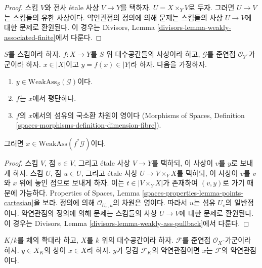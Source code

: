 \begin{proof}
스킴 $V$와 전사 \'etale 사상 $V \to Y$를 택하자.
$U = X \times_Y V$로 두자. 그러면 $U \to V$는 스킴들의 유한 사상이다.
약연관점의 정의에 의해 문제는 스킴들의 사상 $U \to V$에 대한 문제로
환원된다. 이 경우는 Divisors, Lemma
\ref{divisors-lemma-weakly-associated-finite}에서 다룬다.
\end{proof}

\begin{lemma}
\label{lemma-weakly-ass-pullback}
$S$를 스킴이라 하자. $f : X \to Y$를 $S$ 위 대수공간들의 사상이라 하고,
$\mathcal{G}$를 준연접 $\mathcal{O}_Y$-가군이라 하자.
$x \in |X|$이고 $y = f(x) \in |Y|$라 하자. 다음을 가정하자.
\begin{enumerate}
\item $y \in \text{WeakAss}_S(\mathcal{G})$이다.
\item $f$는 $x$에서 평탄하다.
\item $f$의 $x$에서의 섬유의 국소환 차원이 영이다
(Morphisms of Spaces, Definition
\ref{spaces-morphisms-definition-dimension-fibre}).
\end{enumerate}
그러면 $x \in \text{WeakAss}(f^*\mathcal{G})$이다.
\end{lemma}

\begin{proof}
스킴 $V$, 점 $v \in V$, 그리고 \'etale 사상 $V \to Y$를 택하되,
이 사상이 $v$를 $y$로 보내게 하자. 스킴 $U$, 점 $u \in U$, 그리고
\'etale 사상 $U \to V \times_Y X$를 택하되, 이 사상이 $v$를
$v$와 $x$ 위에 놓인 점으로 보내게 하자. 이는
$t \in |V \times_Y X|$가 존재하여 $(v, y)$로 가기 때문에 가능하다.
Properties of Spaces, Lemma
\ref{spaces-properties-lemma-points-cartesian}을 보라.
정의에 의해 $\mathcal{O}_{U_v, u}$의 차원은 영이다.
따라서 $u$는 섬유 $U_v$의 일반점이다. 약연관점의 정의에 의해
문제는 스킴들의 사상 $U \to V$에 대한 문제로 환원된다.
이 경우는 Divisors, Lemma
\ref{divisors-lemma-weakly-ass-pullback}에서 다룬다.
\end{proof}

\begin{lemma}
\label{lemma-weakly-ass-change-fields}
$K/k$를 체의 확대라 하고, $X$를 $k$ 위의 대수공간이라 하자.
$\mathcal{F}$를 준연접 $\mathcal{O}_X$-가군이라 하자.
$y \in X_K$의 상이 $x \in X$라 하자. $y$가 당김
$\mathcal{F}_K$의 약연관점이면 $x$는 $\mathcal{F}$의 약연관점이다.
\end{lemma}

